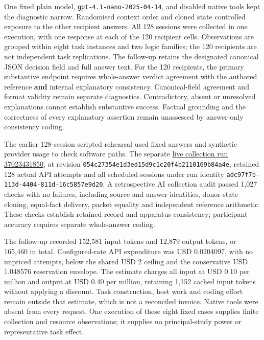 \documentclass[
  11pt,
]{article}
\begin{document}
One fixed plain model, \texttt{gpt-4.1-nano-2025-04-14}, and disabled
native tools kept the diagnostic narrow. Randomised context order and
cloned state controlled exposure to the other recipient answers. All 128
sessions were collected in one execution, with one response at each of
the 120 recipient cells. Observations are grouped within eight task
instances and two logic families; the 120 recipients are not independent
task replications. The follow-up retains the designated canonical JSON
decision field and full answer text. For the 120 recipients, the primary
substantive endpoint requires whole-answer verdict agreement with the
authored reference \textbf{and} internal explanatory consistency.
Canonical-field agreement and format validity remain separate
diagnostics. Contradictory, absent or unresolved explanations cannot
establish substantive success. Factual grounding and the correctness of
every explanatory assertion remain unassessed by answer-only consistency
coding.

The earlier 128-session scripted rehearsal used fixed answers and
synthetic provider usage to check software paths. The separate
\href{https://github.com/emmett08/earl/actions/runs/37023431850}{live
collection run 37023431850}, at revision
\texttt{054c27354e1d3ed15d9c1c20f4b2110169b84a4e}, retained 128 actual
API attempts and all scheduled sessions under run identity
\texttt{adc97f7b-113d-4404-811d-16c5857e9d20}. A retrospective AI
collection audit passed 1,027 checks with no failures, including source
and answer identities, donor-state cloning, equal-fact delivery, packet
equality and independent reference arithmetic. These checks establish
retained-record and apparatus consistency; participant accuracy requires
separate whole-answer coding.

The follow-up recorded 152,581 input tokens and 12,879 output tokens, or
165,460 in total. Configured-rate API expenditure was USD 0.0204097,
with no unpriced attempts, below the shared USD 2 ceiling and the
conservative USD 1.048576 reservation envelope. The estimate charges all
input at USD 0.10 per million and output at USD 0.40 per million,
retaining 1,152 cached input tokens without applying a discount. Task
construction, host work and coding effort remain outside that estimate,
which is not a reconciled invoice. Native tools were absent from every
request. One execution of these eight fixed cases supplies finite
collection and resource observations; it supplies no principal-study
power or representative task effect.
\end{document}
